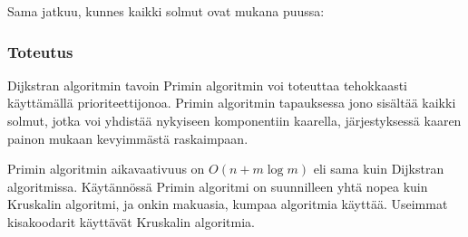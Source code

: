 \begin{samepage}
Sama jatkuu, kunnes kaikki solmut ovat mukana puussa:
\begin{center}
\end{center}
\end{samepage}

\subsubsection{Toteutus}

Dijkstran algoritmin tavoin Primin algoritmin voi toteuttaa
tehokkaasti käyttämällä prioriteettijonoa.
Primin algoritmin tapauksessa jono sisältää kaikki solmut,
jotka voi yhdistää nykyiseen komponentiin kaarella,
järjestyksessä kaaren painon mukaan kevyimmästä raskaimpaan.

Primin algoritmin aikavaativuus on $O(n + m \log m)$
eli sama kuin Dijkstran algoritmissa.
Käytännössä Primin algoritmi on suunnilleen
yhtä nopea kuin Kruskalin algoritmi,
ja onkin makuasia, kumpaa algoritmia käyttää.
Useimmat kisakoodarit käyttävät Kruskalin algoritmia.
